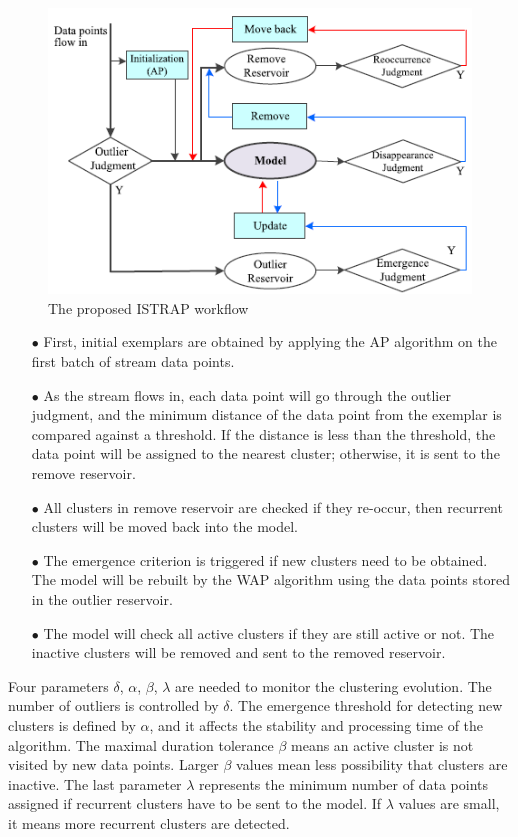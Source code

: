 \begin{figure}
\centering
\includegraphics[width =10 cm]{image/Chapters/Chapter3/istrap1.PNG}
\caption{The proposed ISTRAP workflow}
\label{istrap}
\end{figure}

\begin{itemize}
    \item[$\bullet$] First, initial exemplars are obtained by applying the AP algorithm on the first batch of stream data points.
    \item[$\bullet$] As the stream flows in, each data point will go through the outlier judgment, and the minimum distance of the data point from the exemplar is compared against a threshold. If the distance is less than the threshold, the data point will be assigned to the nearest cluster; otherwise, it is sent to the remove reservoir.
    \item[$\bullet$] All clusters in remove reservoir are checked if they re-occur, then recurrent clusters will be moved back into the model.
    \item[$\bullet$] The emergence criterion is triggered if new clusters need to be obtained. The model will be rebuilt by the WAP algorithm using the data points stored in the outlier reservoir.
    \item[$\bullet$] The model will check all active clusters if they are still active or not. The inactive clusters will be removed and sent to the removed reservoir.
\end{itemize}

Four parameters $\delta$, $\alpha$, $\beta$, $\lambda$  are needed to monitor the clustering evolution. The number of outliers is controlled by $\delta$. The emergence threshold for detecting new clusters is defined by $\alpha$, and it affects the stability and processing time of the algorithm. The maximal duration tolerance $\beta$ means an active cluster is not visited by new data points. Larger $\beta$ values mean less possibility that clusters are inactive. The last parameter $\lambda$ represents the minimum number of data points assigned if recurrent clusters have to be sent to the model. If $\lambda$ values are small, it means more recurrent clusters are detected. 

